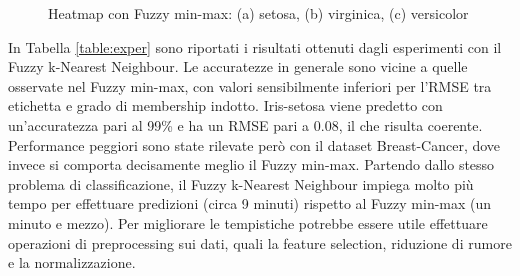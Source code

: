 \documentclass[11pt,  oneside, openany]{book}
\begin{document}
\begin{figure}[h!]
		\centering
		\quad
		 \quad
		 \quad
		\caption{Heatmap con Fuzzy min-max: (a) setosa, (b) virginica, (c) versicolor}
		\label{heatmapgfmm}
	\end{figure}	



In Tabella \ref{table:exper} sono riportati i risultati ottenuti dagli esperimenti con il Fuzzy k-Nearest Neighbour. 
Le accuratezze in generale sono vicine a quelle osservate nel Fuzzy min-max, con valori sensibilmente inferiori per l'RMSE tra etichetta e grado di membership indotto. Iris-setosa viene predetto con un'accuratezza pari al 99\% e ha un RMSE pari a 0.08, il che risulta coerente. Performance peggiori sono state rilevate però con il dataset Breast-Cancer, dove invece si comporta decisamente meglio il Fuzzy min-max. Partendo dallo stesso problema di classificazione, il Fuzzy k-Nearest Neighbour impiega molto più tempo per effettuare predizioni (circa 9 minuti) rispetto al Fuzzy min-max (un minuto e mezzo). Per migliorare le tempistiche potrebbe essere utile effettuare operazioni di preprocessing sui dati, quali la feature selection, riduzione di rumore e la normalizzazione.
\end{document}
